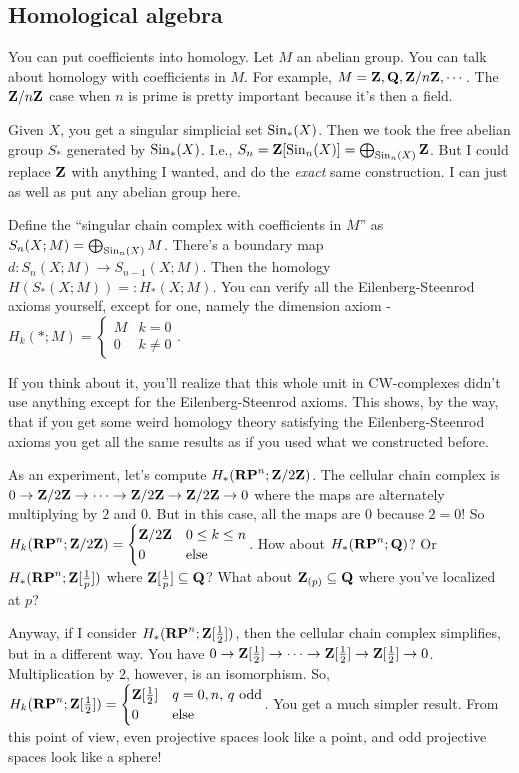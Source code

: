 \subsection{Homological algebra}
You can put coefficients into homology. Let $M$ an abelian group. You can talk about homology with coefficients in $M$. For example, $M=\mathbf Z,\mathbf Q,\mathbf Z/n\mathbf Z,\cdots$. The $\mathbf Z/n\mathbf Z$ case when $n$ is prime is pretty important because it's then a field.

Given $X$, you get a singular simplicial set $\mathrm{Sin}_\ast(X)$. Then we took the free abelian group $S_\ast$ generated by $\mathrm{Sin}_\ast(X)$. I.e., $S_n=\mathbf Z[\mathrm{Sin}_n(X)]=\bigoplus_{\mathrm{Sin}_n(X)}\mathbf Z$. But I could replace $\mathbf Z$ with anything I wanted, and do the \emph{exact} same construction. I can just as well as put any abelian group here.

Define the ``singular chain complex with coefficients in $M$'' as $S_n(X;M)=\bigoplus_{\mathrm{Sin}_n(X)}M$. There's a boundary map $d:S_n(X;M)\to S_{n-1}(X;M)$. Then the homology $ H(S_\ast(X;M))=: H_\ast(X;M)$. You can verify all the Eilenberg-Steenrod axioms yourself, except for one, namely the dimension axiom - $ H_k(\ast;M)=\begin{cases}M & k=0 \\ 0 & k\neq 0\end{cases}$.

If you think about it, you'll realize that this whole unit in CW-complexes didn't use anything except for the Eilenberg-Steenrod axioms. This shows, by the way, that if you get some weird homology theory satisfying the Eilenberg-Steenrod axioms you get all the same results as if you used what we constructed before.

As an experiment, let's compute $ H_\ast(\mathbf{RP}^n;\mathbf Z/2\mathbf Z)$. The cellular chain complex is $0\to \mathbf Z/2\mathbf Z\to\cdots\to\mathbf Z/2\mathbf Z\to\mathbf Z/2\mathbf Z\to 0$ where the maps are alternately multiplying by $2$ and $0$. But in this case, all the maps are $0$ because $2=0$! So $ H_k(\mathbf{RP}^n;\mathbf Z/2\mathbf Z)=\begin{cases}\mathbf Z/2\mathbf Z & 0\leq k\leq n \\ 0 & \text{else}\end{cases}$. How about $ H_\ast(\mathbf{RP}^n;\mathbf Q)$? Or $ H_\ast(\mathbf{RP}^n;\mathbf Z[\frac{1}{p}])$ where $\mathbf Z[\frac{1}{p}]\subseteq \mathbf Q$? What about $\mathbf Z_{(p)}\subseteq \mathbf Q$ where you've localized at $p$?

Anyway, if I consider $ H_\ast(\mathbf{RP}^n;\mathbf Z[\frac{1}{2}])$, then the cellular chain complex simplifies, but in a different way. You have $0\to \mathbf Z[\frac{1}{2}] \to\cdots\to \mathbf Z[\frac{1}{2}] \to \mathbf Z[\frac{1}{2}] \to 0$. Multiplication by $2$, however, is an isomorphism. So, $ H_k(\mathbf{RP}^n;\mathbf Z[\frac{1}{2}])=\begin{cases}\mathbf Z[\frac{1}{2}] & q=0,n,\, q \text{ odd} \\ 0 & \text{else}\end{cases}$. You get a much simpler result. From this point of view, even projective spaces look like a point, and odd projective spaces look like a sphere!


